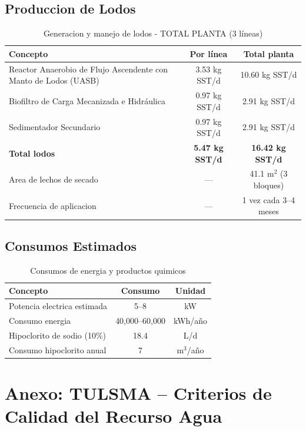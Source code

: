 \documentclass[12pt,a4paper]{article}
\begin{document}
\subsection{Produccion de Lodos}

\begin{table}[H]
\centering
\caption{Generacion y manejo de lodos - TOTAL PLANTA (3 líneas)}
\begin{tabular}{p{6cm}cc}
\toprule
\textbf{Concepto} & \textbf{Por línea} & \textbf{Total planta} \\
\midrule
Reactor Anaerobio de Flujo Ascendente con Manto de Lodos (UASB) & 3.53 kg SST/d & 10.60 kg SST/d \\
Biofiltro de Carga Mecanizada e Hidráulica & 0.97 kg SST/d & 2.91 kg SST/d \\
Sedimentador Secundario & 0.97 kg SST/d & 2.91 kg SST/d \\
\midrule
\textbf{Total lodos} & \textbf{5.47 kg SST/d} & \textbf{16.42 kg SST/d} \\
Area de lechos de secado & --- & 41.1 m$^2$ (3 bloques) \\
Frecuencia de aplicacion & --- & 1 vez cada 3--4 meses \\
\bottomrule
\end{tabular}
\end{table}

\subsection{Consumos Estimados}

\begin{table}[H]
\centering
\caption{Consumos de energia y productos quimicos}
\begin{tabular}{lcc}
\toprule
\textbf{Concepto} & \textbf{Consumo} & \textbf{Unidad} \\
\midrule
Potencia electrica estimada & 5--8 & kW \\
Consumo energia & 40,000--60,000 & kWh/a\~no \\
Hipoclorito de sodio (10\%) & 18.4 & L/d \\
Consumo hipoclorito anual & 7 & m$^3$/a\~no \\
\bottomrule
\end{tabular}
\end{table}




\newpage




\newpage
\appendix
\section{Anexo: TULSMA -- Criterios de Calidad del Recurso Agua}
\label{app:tulsma}
\end{document}
